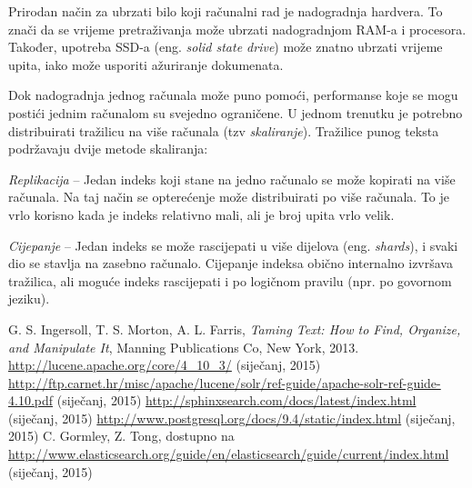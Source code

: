 \documentclass[a4paper,twoside,12pt]{scrreprt}
\begin{document}
Prirodan način za ubrzati bilo koji računalni rad je nadogradnja hardvera. To znači da se vrijeme pretraživanja može ubrzati nadogradnjom RAM-a i procesora. Također, upotreba SSD-a (eng. \textit{solid state drive}) može znatno ubrzati vrijeme upita, iako može usporiti ažuriranje dokumenata.

Dok nadogradnja jednog računala može puno pomoći, performanse koje se mogu postići jednim računalom su svejedno ograničene. U jednom trenutku je potrebno distribuirati tražilicu na više računala (tzv \textit{skaliranje}). Tražilice punog teksta podržavaju dvije metode skaliranja:

\begin{compactenum}
  \item \textit{Replikacija} – Jedan indeks koji stane na jedno računalo se može kopirati na više računala. Na taj način se opterećenje može distribuirati po više računala. To je vrlo korisno kada je indeks relativno mali, ali je broj upita vrlo velik.
  \item \textit{Cijepanje} – Jedan indeks se može rascijepati u više dijelova (eng. \textit{shards}), i svaki dio se stavlja na zasebno računalo. Cijepanje indeksa obično internalno izvršava tražilica, ali moguće indeks rascijepati i po logičnom pravilu (npr. po govornom jeziku).
\end{compactenum}

\begin{thebibliography}{99}
   G. S. Ingersoll, T. S. Morton, A. L. Farris, \textit{Taming Text: How to Find, Organize, and Manipulate It}, Manning Publications Co, New York, 2013.
   \url{http://lucene.apache.org/core/4_10_3/} (siječanj, 2015)
   \url{http://ftp.carnet.hr/misc/apache/lucene/solr/ref-guide/apache-solr-ref-guide-4.10.pdf} (siječanj, 2015)
   \url{http://sphinxsearch.com/docs/latest/index.html} (siječanj, 2015)
   \url{http://www.postgresql.org/docs/9.4/static/index.html} (siječanj, 2015)
   C. Gormley, Z. Tong, dostupno na \url{http://www.elasticsearch.org/guide/en/elasticsearch/guide/current/index.html} (siječanj, 2015)
\end{thebibliography}

\pagestyle{empty}

\begin{sazetak}
\end{sazetak}

\begin{summary}
\end{summary}

\begin{cv}
\end{cv}
\end{document}
